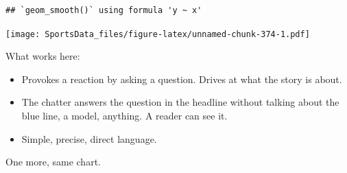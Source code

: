 \documentclass[
]{book}
\providecommand{\tightlist}{%
  \setlength{\itemsep}{0pt}\setlength{\parskip}{0pt}}
\begin{document}
\begin{verbatim}
## `geom_smooth()` using formula 'y ~ x'
\end{verbatim}

\texttt{[image: SportsData\_files/figure-latex/unnamed-chunk-374-1.pdf]}

What works here:

\begin{itemize}
\tightlist
\item
  Provokes a reaction by asking a question. Drives at what the story is about.
\item
  The chatter answers the question in the headline without talking about the blue line, a model, anything. A reader can see it.
\item
  Simple, precise, direct language.
\end{itemize}

One more, same chart.
\end{document}
